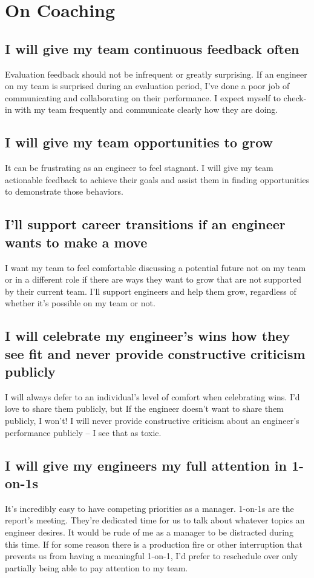 \documentclass[11pt]{amsart}
\begin{document}
\section*{On Coaching} %

\subsection*{I will give my team continuous feedback often} 
Evaluation feedback should not be infrequent or greatly surprising. If an engineer on my team is surprised during an evaluation period, I’ve done a poor job of communicating and collaborating on their performance. I expect myself to check-in with my team frequently and communicate clearly how they are doing.

\subsection*{I will give my team opportunities to grow}
It can be frustrating as an engineer to feel stagnant. I will give my team actionable feedback to achieve their goals and assist them in finding opportunities to demonstrate those behaviors.

\subsection*{I’ll support career transitions if an engineer wants to make a move}
I want my team to feel comfortable discussing a potential future not on my team or in a different role if there are ways they want to grow that are not supported by their current team. I’ll support engineers and help them grow, regardless of whether it’s possible on my team or not.

\subsection*{I will celebrate my engineer's wins how they see fit and never provide constructive criticism publicly}
I will always defer to an individual's level of comfort when celebrating wins. I’d love to share them publicly, but If the engineer doesn't want to share them publicly, I won’t! I will never provide constructive criticism about an engineer's performance publicly – I see that as toxic.

\subsection*{I will give my engineers my full attention in 1-on-1s}
It’s incredibly easy to have competing priorities as a manager. 1-on-1s are the report's meeting. They’re dedicated time for us to talk about whatever topics an engineer desires. It would be rude of me as a manager to be distracted during this time. If for some reason there is a production fire or other interruption that prevents us from having a meaningful 1-on-1, I’d prefer to reschedule over only partially being able to pay attention to my team.
\end{document}
